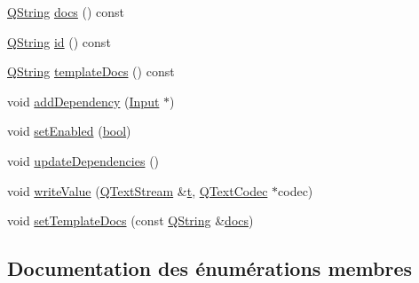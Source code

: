 \begin{DoxyCompactItemize}
\item 
\hyperlink{class_q_string}{Q\+String} \hyperlink{class_input_string_ae8c833a186bc89fb7c1c62bdeea192ff}{docs} () const 
\item 
\hyperlink{class_q_string}{Q\+String} \hyperlink{class_input_string_ae41fde1d4de62d762094778a91d3afe2}{id} () const 
\item 
\hyperlink{class_q_string}{Q\+String} \hyperlink{class_input_string_ab68dd8e3de51ec030e2b09f6dc8acd42}{template\+Docs} () const 
\item 
void \hyperlink{class_input_string_a46b5ce5badcf1c6df3a891810cb91e41}{add\+Dependency} (\hyperlink{class_input}{Input} $\ast$)
\item 
void \hyperlink{class_input_string_add9620f611a4e69090232a7b15c7e74e}{set\+Enabled} (\hyperlink{qglobal_8h_a1062901a7428fdd9c7f180f5e01ea056}{bool})
\item 
void \hyperlink{class_input_string_afc5b4853b2226058f4b996c114967f81}{update\+Dependencies} ()
\item 
void \hyperlink{class_input_string_ae515cffbe50507d2c97ffa3ea36cade0}{write\+Value} (\hyperlink{class_q_text_stream}{Q\+Text\+Stream} \&\hyperlink{058__bracket__recursion_8tcl_a69e959f6901827e4d8271aeaa5fba0fc}{t}, \hyperlink{class_q_text_codec}{Q\+Text\+Codec} $\ast$codec)
\item 
void \hyperlink{class_input_string_af6b070828f85757ca6cf565288ab1dd1}{set\+Template\+Docs} (const \hyperlink{class_q_string}{Q\+String} \&\hyperlink{class_input_string_ae8c833a186bc89fb7c1c62bdeea192ff}{docs})
\end{DoxyCompactItemize}


\subsection{Documentation des énumérations membres}
\hypertarget{class_input_string_a7cfa8b8ad573f92ac8a7c850cf63b04b}{}
